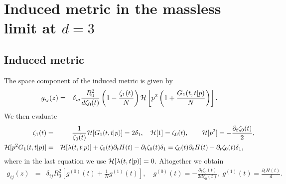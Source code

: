 \documentclass[preprint]{ptephy_v1}%
\begin{document}
\section{Induced metric in the massless limit at $d=3$}
\label{app:metric}
\subsection{Induced metric}
The space component of the induced metric is given by
\begin{eqnarray}
g_{ij}(z) &=& \delta_{ij}\frac{R_0^2}{d\zeta_0(t)} \left(1-\frac{\zeta_1(t)}{N}\right) {\cal H}\left[ p^2\left(1 +\frac{G_1(t,t\vert p)}{N}\right)\right] .
\end{eqnarray}
We then evaluate
\begin{eqnarray}
\zeta_1(t) &=& \frac{1}{\zeta_0(t)} {\cal H}[ G_1(t,t\vert p)] = 2 \delta_1, \quad
{\cal H}[1] = \zeta_0(t), \qquad  {\cal H}[p^2] = -\frac{\partial_t\zeta_0(t)}{2}, \\ 
{\cal H}[ p^2 G_1(t,t\vert p)] &=& {\cal H}[\lambda(t,t\vert p)] +\zeta_0(t) \partial_t H(t) -\partial_t\zeta_0(t)\delta_1
=\zeta_0(t) \partial_t H(t) -\partial_t\zeta_0(t)\delta_1, ~~~~~
\end{eqnarray}
where in the last equation we use $ {\cal H}[\lambda(t,t\vert p)] = 0$. Altogether we obtain
\begin{eqnarray}
g_{ij}(z) &=& \delta_{ij} R_0^2\left[ g^{(0)}(t) + \frac{1}{N} g^{(1)}(t) \right], \quad
g^{(0)}(t) =-\frac{\partial_t\zeta_0(t)}{2d\zeta_0(t)}, \ g^{(1)}(t) =\frac{\partial_t H(t)}{d}.~~
\end{eqnarray}
\end{document}
